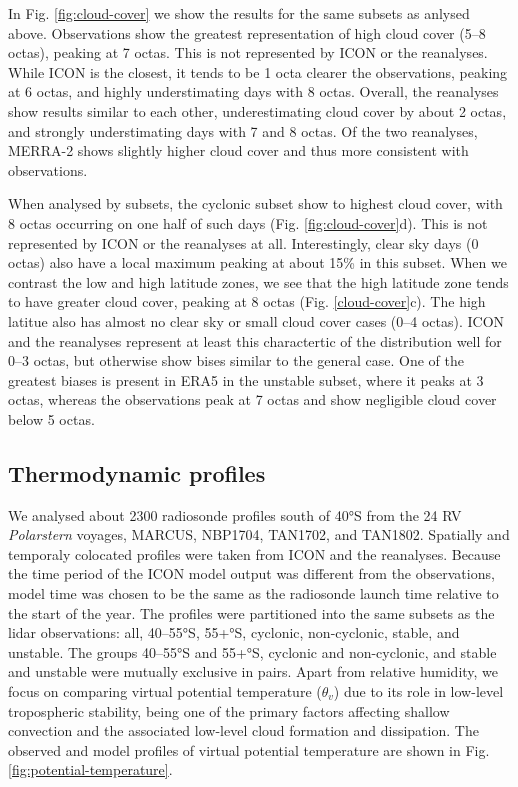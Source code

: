 \documentclass[12pt,a4paper]{article}
\begin{document}
In Fig.  \ref{fig:cloud-cover} we show the results for the same subsets as
anlysed above. Observations show the greatest representation of high cloud
cover (5--8 octas), peaking at 7 octas. This is not represented by ICON or the
reanalyses.  While ICON is the closest, it tends to be 1 octa clearer the
observations, peaking at 6 octas, and highly understimating days with 8 octas.
Overall, the reanalyses show results similar to each other, underestimating
cloud cover by about 2 octas, and strongly understimating days with 7 and 8
octas. Of the two reanalyses, MERRA-2 shows slightly higher cloud cover and
thus more consistent with observations.

When analysed by subsets, the cyclonic subset show to highest cloud cover, with
8 octas occurring on one half of such days (Fig. \ref{fig:cloud-cover}d).  This
is not represented by ICON or the reanalyses at all. Interestingly, clear sky
days (0 octas) also have a local maximum peaking at about 15\% in this subset.
When we contrast the low and high latitude zones, we see that the high latitude
zone tends to have greater cloud cover, peaking at 8 octas (Fig.
\ref{cloud-cover}c). The high latitue also has almost no clear sky or small
cloud cover cases (0--4 octas). ICON and the reanalyses represent at least this
charactertic of the distribution well for 0--3 octas, but otherwise show bises
similar to the general case. One of the greatest biases is present in ERA5 in
the unstable subset, where it peaks at 3 octas, whereas the observations peak
at 7 octas and show negligible cloud cover below 5 octas.

\subsection{Thermodynamic proﬁles}

We analysed about 2300 radiosonde proﬁles south of 40°S from the 24 RV
\emph{Polarstern} voyages, MARCUS, NBP1704, TAN1702, and TAN1802. Spatially and
temporaly colocated profiles were taken from ICON and the reanalyses. Because
the time period of the ICON model output was different from the observations,
model time was chosen to be the same as the radiosonde launch time relative to
the start of the year. The profiles were partitioned into the same subsets as
the lidar observations: all, 40--55°S, 55+°S, cyclonic, non-cyclonic, stable,
and unstable. The groups 40--55°S and 55+°S, cyclonic and non-cyclonic, and
stable and unstable were mutually exclusive in pairs. Apart from relative
humidity, we focus on comparing virtual potential temperature ($\theta_v$) due
to its role in low-level tropospheric stability, being one of the primary
factors affecting shallow convection and the associated low-level cloud
formation and dissipation. The observed and model profiles of virtual potential
temperature are shown in Fig. \ref{fig:potential-temperature}.
\end{document}
